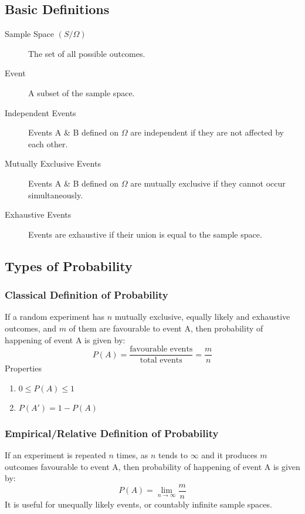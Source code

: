\documentclass[
10pt, %
a4paper, %
]{report}
\begin{document}
\subsection*{Basic Definitions}
\begin{description}
\item[Sample Space \((S/\Omega)\)] The set of all possible outcomes.
\item[Event] A subset of the sample space.
\item[Independent Events] Events A \& B defined on \(\Omega\) are independent if they are not affected  by each other.
\item[Mutually Exclusive Events] Events A \& B defined on \(\Omega\) are mutually exclusive if they cannot occur simultaneously.
\item[Exhaustive Events] Events are exhaustive if their union is equal to the sample space.
\end{description}



\subsection*{Types of Probability}
\subsubsection*{Classical Definition of Probability}
    If a random experiment has \(n\) mutually exclusive, equally likely and exhaustive outcomes, and \(m\) of them are favourable to event A, then probability of happening of event A is given by:
    \[
    P(A)=\frac{\text{favourable events}}{\text{total events}}=\frac{m}{n}
    \]
Properties
\begin{enumerate}
\item \(0\leq P(A) \leq 1\)
\item \(P(A')=1-P(A)\)
\end{enumerate}

\subsubsection*{Empirical/Relative Definition of Probability}
 If an experiment is repeated \(n\) times, as \(n\) tends to \(\infty\) and it produces \(m\) outcomes favourable to event A, then probability of happening of event A is given by:
\[
P(A)=\lim_{n\to\infty}\frac{m}{n}
\]
It is useful for unequally likely events, or countably infinite sample spaces.
\end{document}
